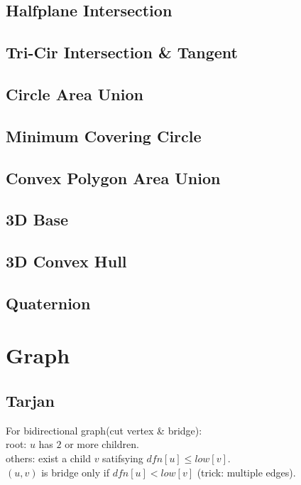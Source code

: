 \documentclass[10pt]{article}
\begin{document}
\subsection{Halfplane Intersection}


\subsection{Tri-Cir Intersection \& Tangent}



\subsection{Circle Area Union}

\subsection{Minimum Covering Circle}

\subsection{Convex Polygon Area Union}

\subsection{3D Base}

\subsection{3D Convex Hull}

\subsection{Quaternion}


\section{Graph}
\subsection{Tarjan}

For bidirectional graph(cut vertex \& bridge): \\
root: $u$ has $2$ or more children. \\
others: exist a child $v$ satifsying $dfn[u] \le low[v]$. \\
$(u, v)$ is bridge only if $dfn[u] < low[v]$ (trick: multiple edges).\\
\end{document}

